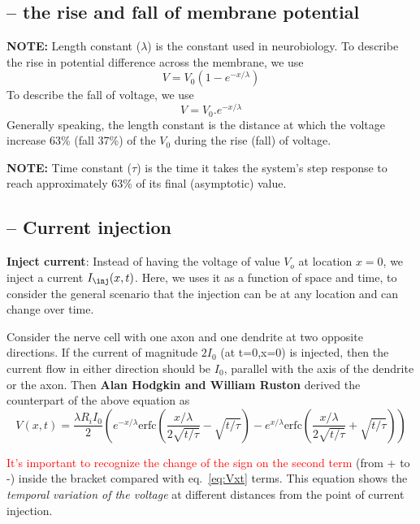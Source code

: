 \subsection{-- the rise and fall of membrane potential}

\begin{mdframed}

{\bf NOTE:} Length constant ($\lambda$) is the constant used in
neurobiology. To describe the rise in potential difference across the
membrane, we use
\begin{equation}
  V = V_0 (1-e^{-x/\lambda})
\end{equation}
To describe the fall of voltage, we use
\begin{equation}
  V = V_0 . e^{-x/\lambda}
\end{equation}
Generally speaking, the length constant is the distance at which the
voltage increase 63\% (fall 37\%) of the $V_0$ during the rise (fall)
of voltage.
\end{mdframed}


{\bf NOTE:} Time constant ($\tau$) is the time it takes the system's
step response to reach approximately 63\% of its final (asymptotic)
value.

\subsection{-- Current injection}

{\bf Inject current}: Instead of having the voltage of value $V_o$ at location
$x=0$, we inject a current $I_\inj(x,t)$. Here, we uses it as a function
of space and time, to consider the general scenario that the injection can
be at any location and can change over time.

Consider the nerve cell with one axon and one dendrite at two opposite
directions. If the current of magnitude $2I_0$ (at t=0,x=0) is injected, then
the current flow in either direction should be $I_0$, parallel with the axis of
the dendrite or the axon. Then {\bf Alan Hodgkin and William Ruston} derived the
counterpart of the above equation as
\begin{equation}
  V(x,t) = \frac{\lambda R_i I_0}{2}\left( e^{-x/\lambda}
    \text{erfc}(\frac{x/\lambda}{2\sqrt{t/\tau}}-\sqrt{t/\tau}) - e^{x/\lambda} \text{erfc}(\frac{x/\lambda}{2\sqrt{t/\tau}}+\sqrt{t/\tau}) \right)
\end{equation}

\textcolor{red}{It's important to recognize the change of the sign on the second
term} (from + to -) inside the bracket compared with eq.~\eqref{eq:Vxt} terms.
This equation shows the {\it temporal variation of the voltage} at different
distances from the point of current injection.

